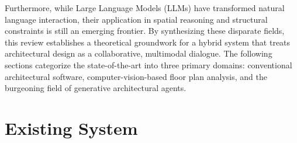 \documentclass[12pt]{report}
\begin{document}
Furthermore, while Large Language Models (LLMs) have transformed natural language interaction, their application in spatial reasoning and structural constraints is still an emerging frontier. By synthesizing these disparate fields, this review establishes a theoretical groundwork for a hybrid system that treats architectural design as a collaborative, multimodal dialogue. The following sections categorize the state-of-the-art into three primary domains: conventional architectural software, computer-vision-based floor plan analysis, and the burgeoning field of generative architectural agents.

\section{Existing System}
\end{document}
